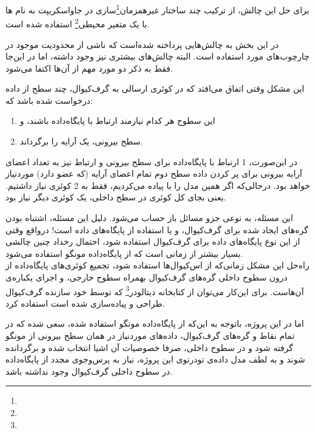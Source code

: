 برای حل این چالش، از ترکیب چند ساختار غیرهمزمان‌\footnote{}سازی در جاواسکریپت به نام ها با یک متغیر محیطی\footnote{} استفاده شده است.


در این بخش به چالش‌هایی پرداخته شده‌است که ناشی از محدودیت موجود در چارچوب‌های مورد استفاده است. البته چالش‌های بیشتری نیز وجود داشته، ‌اما در این‌جا فقط به ذکر دو مورد مهم از آن‌ها اکتفا می‌شود.

\newpage


این مشکل وقتی اتفاق می‌افتد که در کوئری ارسالی به گرف‌کیوال، چند سطح از  داده درخواست شده باشد که\cite{gql:nplusone}:
\begin{enumerate}
	\item این سطوح هر کدام نیازمند ارتباط با پایگاه‌داده باشند، و
	\item سطح بیرونی، یک آرایه را برگرداند.
\end{enumerate}

در این‌صورت، 1 ارتباط با پایگاه‌داده برای سطح بیرونی و  ارتباط نیز به تعداد اعضای آرایه بیرونی برای پر کردن داده سطح دوم تمام اعضای آرایه (که  عضو دارد) موردنیاز خواهد بود. درحالی‌که اگر همین مدل را با  پیاده می‌کردیم، فقط به 2 کوئری نیاز داشتیم. یعنی بجای کل  کوئری در سطح داخلی، یک کوئری دیگر نیاز بود\cite{gql:nplusone}.

این مسئله، به نوعی جزو مسائل باز حساب می‌شود. دلیل این مسئله، اشتباه بودن گره‌های ایجاد شده برای گرف‌کیوال، و یا استفاده از پایگاه‌های داده  است! درواقع وقتی از این نوع پایگاه‌های داده برای گرف‌کیوال استفاده شود، احتمال رخداد چنین چالشی بسیار بیشتر از زمانی است که از پایگاه‌داده مونگو استفاده می‌شود.\\

راه‌حل این مشکل زمانی‌که از اس‌کیوال‌ها استفاده شود، تجمیع کوئری‌های پایگاه‌داده از درون سطوح داخلی گره‌های گرف‌کیوال بهمراه سطوح خارجی، و اجرای یکباره‌ی آن‌هاست. برای این‌کار می‌توان از کتابخانه دیتالودر\footnote{} که توسط خود سازنده گرف‌کیوال طراحی و پیاده‌سازی شده است استفاده کرد.

اما در این پروژه، باتوجه به این‌که از پایگاه‌داده مونگو استفاده شده، سعی شده که در تمام نقاط و گره‌های گرف‌کیوال، داده‌های موردنیاز در همان سطح بیرونی از مونگو گرفته شود و در سطوح داخلی، صرفا خصوصیات آن اشیا انتخاب شده و برگردانده شوند و به لطف مدل داده‌ی تودرتوی این پروژه، نیاز به پرس‌وجوی مجدد از پایگاه‌داده در سطوح داخلی گرف‌کیوال وجود نداشته باشد.

